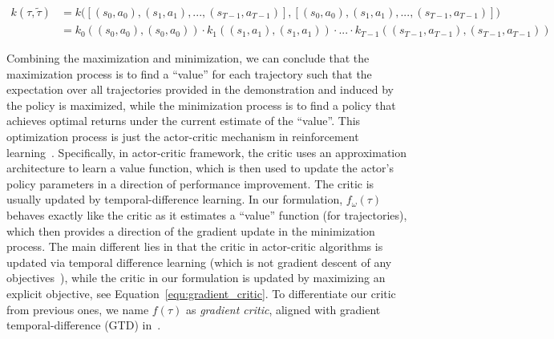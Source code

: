 \begin{align*}
k(\tau, \tilde{\tau}) &= k\big([(s_0, a_0), (s_1, a_1), ..., (s_{T-1}, a_{T-1})], [(s_0, a_0), (s_1, a_1), ..., (s_{T-1}, a_{T-1})]\big) \\
&= k_{0}((s_0, a_0), (s_0, a_0)) \cdot k_{1}((s_1, a_1), (s_1, a_1)) \cdot ... \cdot k_{T-1}((s_{T-1}, a_{T-1}), (s_{T-1}, a_{T-1}))
\end{align*}

Combining the maximization and minimization,
we can conclude that the maximization process is to find a ``value'' for each trajectory such that the expectation over all trajectories provided in the demonstration and induced by the policy is maximized, 
while the minimization process is to find a policy that achieves optimal returns under the current estimate of the ``value''. 
This optimization process is just the actor-critic mechanism in reinforcement learning~\citep{konda2000actor}.
Specifically, in actor-critic framework, the critic uses an approximation architecture to learn a value function, which is then used to update the actor's policy parameters in a direction of performance improvement. The critic is usually updated by temporal-difference learning. In our formulation, $f_{\omega}(\tau)$ behaves exactly like the critic as it estimates a ``value'' function (for trajectories), which then provides a direction of the gradient update in the minimization process. 
The main different lies in that the critic in actor-critic algorithms is updated via temporal difference learning (which is not gradient descent of any objectives~\citep{sutton2008convergent}), 
while the critic in our formulation is updated by maximizing an explicit objective, see Equation~\ref{equ:gradient_critic}. 
To differentiate our critic from previous ones, we name $f(\tau)$ as \textit{gradient critic}, aligned with gradient temporal-difference (GTD) in~\citet{sutton2008convergent,sutton2009fast}. 


